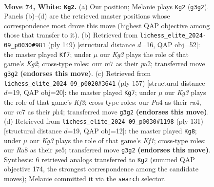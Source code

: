 \documentclass[11pt]{article}
\begin{document}
\clearpage

\begin{figure}[p]\centering
\begin{subfigure}{0.46\textwidth}\centering
\resizebox{\linewidth}{!}{%
\newchessgame
\chessboard[
  setfen={R7/2r2p2/3Rpk2/8/P3P3/5PK1/8/8 w - - 39 74},
  showmover=false,
  pgfstyle=straightmove, color=movearrow, markmove={g3-g2}
]}
\caption{}
\end{subfigure}\hfill
\begin{subfigure}{0.46\textwidth}\centering
\resizebox{\linewidth}{!}{%
\newchessgame
\chessboard[
  setfen={8/p5k1/8/4PK1p/5P2/5r1p/P6R/8 b - - 5 75},
  showmover=false,
  pgfstyle=straightmove, color=movearrow, markmove={g7-f7}
]}
\caption{}
\end{subfigure}
\\[4pt]
\begin{subfigure}{0.46\textwidth}\centering
\resizebox{\linewidth}{!}{%
\newchessgame
\chessboard[
  setfen={8/8/5kp1/7p/R6P/1r3PK1/6P1/8 b - - 55 79},
  showmover=false,
  pgfstyle=straightmove, color=movearrow, markmove={f6-g7}
]}
\caption{}
\end{subfigure}\hfill
\begin{subfigure}{0.46\textwidth}\centering
\resizebox{\linewidth}{!}{%
\newchessgame
\chessboard[
  setfen={5k2/5p2/8/4PK1p/5P1P/8/1p1R4/1r6 b - - 32 66},
  showmover=false,
  pgfstyle=straightmove, color=movearrow, markmove={f8-g8}
]}
\caption{}
\end{subfigure}
\caption{\textbf{Move 74, White: \texttt{Kg2}.} (a) Our position; Melanie plays \texttt{Kg2} (\texttt{g3g2}). Panels (b)--(d) are the retrieved master positions whose correspondence most drove this move (highest QAP objective among those that transfer to it). (b) Retrieved from \texttt{lichess\_elite\_2024-09\_p0030\#981} (ply 149) [structural distance $d$=16, QAP obj=52]: the master played \texttt{Kf7}; under $\mu$ our \emph{Kg3} plays the role of that game's \emph{Kg2}; cross-type roles: our \emph{r}c7 as their \emph{p}a2; transferred move \texttt{g3g2} \textbf{(endorses this move)}. (c) Retrieved from \texttt{lichess\_elite\_2024-09\_p0020\#3641} (ply 157) [structural distance $d$=19, QAP obj=20]: the master played \texttt{Kg7}; under $\mu$ our \emph{Kg3} plays the role of that game's \emph{Kf3}; cross-type roles: our \emph{P}a4 as their \emph{r}a4, our \emph{r}c7 as their \emph{p}h4; transferred move \texttt{g3g2} \textbf{(endorses this move)}. (d) Retrieved from \texttt{lichess\_elite\_2024-09\_p0030\#1198} (ply 131) [structural distance $d$=19, QAP obj=12]: the master played \texttt{Kg8}; under $\mu$ our \emph{Kg3} plays the role of that game's \emph{Kf1}; cross-type roles: our \emph{R}a8 as their \emph{p}e5; transferred move \texttt{g3g2} \textbf{(endorses this move)}. Synthesis: 6 retrieved analogs transferred to \texttt{Kg2} (summed QAP objective 174, the strongest correspondence among the candidate moves); Melanie committed it via the \texttt{search} selector.}
\label{fig:thought-m146}
\end{figure}
\end{document}
